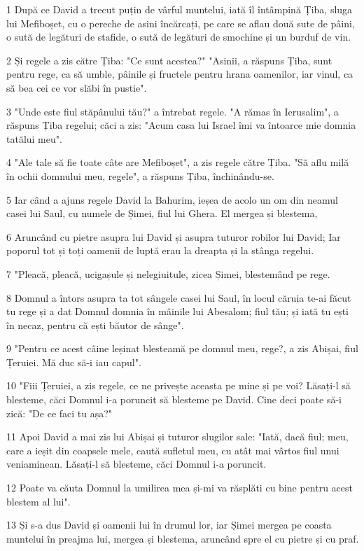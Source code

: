 \par 1 După ce David a trecut puțin de vârful muntelui, iată îl întâmpină Țiba, sluga lui Mefiboșet, cu o pereche de asini încărcați, pe care se aflau două sute de pâini, o sută de legături de stafide, o sută de legături de smochine și un burduf de vin.
\par 2 Și regele a zis către Țiba: "Ce sunt acestea?" "Asinii, a răspuns Țiba, sunt pentru rege, ca să umble, pâinile și fructele pentru hrana oamenilor, iar vinul, ca să bea cei ce vor slăbi în pustie".
\par 3 "Unde este fiul stăpânului tău?" a întrebat regele. "A rămas în Ierusalim", a răspuns Țiba regelui; căci a zis: "Acum casa lui Israel îmi va întoarce mie domnia tatălui meu".
\par 4 "Ale tale să fie toate câte are Mefiboșet", a zis regele către Țiba. "Să aflu milă în ochii domnului meu, regele", a răspuns Țiba, închinându-se.
\par 5 Iar când a ajuns regele David la Bahurim, ieșea de acolo un om din neamul casei lui Saul, cu numele de Șimei, fiul lui Ghera. El mergea și blestema,
\par 6 Aruncând cu pietre asupra lui David și asupra tuturor robilor lui David; Iar poporul tot și toți oamenii de luptă erau la dreapta și la stânga regelui.
\par 7 "Pleacă, pleacă, ucigașule și nelegiuitule, zicea Șimei, blestemând pe rege.
\par 8 Domnul a întors asupra ta tot sângele casei lui Saul, în locul căruia te-ai făcut tu rege și a dat Domnul domnia în mâinile lui Abesalom; fiul tău; și iată tu ești în necaz, pentru că ești băutor de sânge".
\par 9 "Pentru ce acest câine leșinat blesteamă pe domnul meu, rege?, a zis Abișai, fiul Țeruiei. Mă duc să-i iau capul".
\par 10 "Fiii Țeruiei, a zis regele, ce ne privește aceasta pe mine și pe voi? Lăsați-l să blesteme, căci Domnul i-a poruncit să blesteme pe David. Cine deci poate să-i zică: "De ce faci tu așa?"
\par 11 Apoi David a mai zis lui Abișai și tuturor slugilor sale: "Iată, dacă fiul; meu, care a ieșit din coapsele mele, caută sufletul meu, cu atât mai vârtos fiul unui veniaminean. Lăsați-l să blesteme, căci Domnul i-a poruncit.
\par 12 Poate va căuta Domnul la umilirea mea și-mi va răsplăti cu bine pentru acest blestem al lui".
\par 13 Și s-a dus David și oamenii lui în drumul lor, iar Șimei mergea pe coasta muntelui în preajma lui, mergea și blestema, aruncând spre el cu pietre și cu praf.
